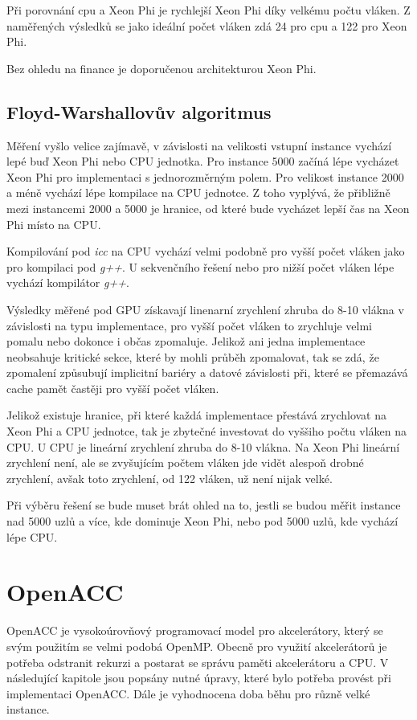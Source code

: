 \documentclass[a4paper,11pt]{article}
\begin{document}
 Při porovnání cpu a Xeon Phi je rychlejší Xeon Phi díky velkému počtu vláken. Z naměřených výsledků se jako
 ideální počet vláken zdá 24 pro cpu a 122 pro Xeon Phi.
 
 Bez ohledu na finance je doporučenou architekturou Xeon Phi.
 
  \subsection{Floyd-Warshallovův algoritmus}
      
      
    Měření vyšlo velice zajímavě, v závislosti na velikosti vstupní instance vychází lepé buď Xeon Phi nebo
    CPU jednotka. Pro instance 5000 začíná lépe vycházet Xeon Phi pro implementaci s jednorozměrným polem. Pro velikost instance 2000 a méně vychází lépe kompilace
     na CPU jednotce. Z toho vyplývá, že přibližně mezi instancemi 2000 a 5000 je hranice, od které bude vycházet lepší čas na Xeon Phi místo na CPU.
     
     Kompilování pod \textit{icc} na CPU vychází velmi podobně pro vyšší počet vláken jako pro kompilaci pod \textit{g++}. U sekvenčního řešení nebo pro nižší počet vláken lépe vychází kompilátor \textit{g++}.
    
     Výsledky měřené pod GPU získavají linenarní zrychlení zhruba do 8-10 vlákna v závislosti na typu implementace, pro vyšší počet vláken to zrychluje velmi pomalu nebo
     dokonce i občas zpomaluje. Jelikož ani jedna implementace neobsahuje kritické sekce, které by mohli průběh zpomalovat, tak se zdá, že zpomalení způsubují
     implicitní bariéry a datové závislosti při, které se přemazává cache pamět častěji pro vyšší počet vláken.
 
    Jelikož existuje hranice, při které každá implementace přestává zrychlovat na Xeon Phi a CPU jednotce, tak je zbytečné investovat do vyššiho počtu vláken na CPU.
    U CPU je lineární zrychlení zhruba do 8-10 vlákna. Na Xeon Phi lineární zrychlení není, ale se zvyšujícím počtem vláken jde vidět alespoň drobné zrychlení, avšak toto 
    zrychlení, od 122 vláken, už není nijak velké.
     
     Při výběru řešení se bude muset brát ohled na to, jestli se budou měřit instance nad 5000 uzlů a více, kde dominuje Xeon Phi, nebo pod 5000 uzlů, kde vychází lépe CPU.
 
 \section{OpenACC}
 OpenACC je vysokoúrovňový programovací model pro akcelerátory, který se svým použitím se velmi podobá OpenMP.
 Obecně pro využití akcelerátorů je potřeba odstranit rekurzi a postarat se správu paměti akcelerátoru
 a CPU. 
 V následující kapitole jsou popsány nutné úpravy, které bylo potřeba provést při implementaci OpenACC. 
 Dále je vyhodnocena doba běhu pro různě velké instance.
 
\end{document}
